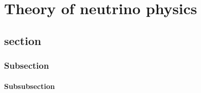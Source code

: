 \chapter{Theory of neutrino physics}\label{chapterTheory}

\section{section}

\subsection{Subsection}

\subsubsection{Subsubsection}